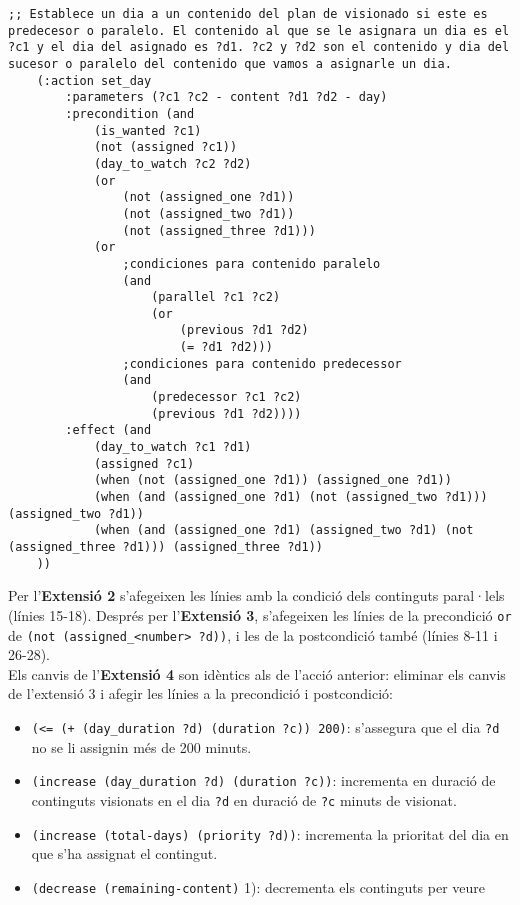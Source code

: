 \documentclass[a4paper]{article}
\begin{document}
	\begin{lstlisting}[language=PDDL, caption={Acció set\_day}, label={lst:set_day}]
	;; Establece un dia a un contenido del plan de visionado si este es predecesor o paralelo. El contenido al que se le asignara un dia es el ?c1 y el dia del asignado es ?d1. ?c2 y ?d2 son el contenido y dia del sucesor o paralelo del contenido que vamos a asignarle un dia.
	(:action set_day
		:parameters (?c1 ?c2 - content ?d1 ?d2 - day)
		:precondition (and 
			(is_wanted ?c1)
			(not (assigned ?c1))
			(day_to_watch ?c2 ?d2)
			(or 
				(not (assigned_one ?d1))
				(not (assigned_two ?d1))
				(not (assigned_three ?d1)))
			(or 
				;condiciones para contenido paralelo
				(and
					(parallel ?c1 ?c2)
					(or 
						(previous ?d1 ?d2)
						(= ?d1 ?d2)))
				;condiciones para contenido predecessor
				(and
					(predecessor ?c1 ?c2)
					(previous ?d1 ?d2))))
		:effect (and 
			(day_to_watch ?c1 ?d1)
			(assigned ?c1)
			(when (not (assigned_one ?d1)) (assigned_one ?d1))
			(when (and (assigned_one ?d1) (not (assigned_two ?d1))) (assigned_two ?d1))
			(when (and (assigned_one ?d1) (assigned_two ?d1) (not (assigned_three ?d1))) (assigned_three ?d1))
	))
	\end{lstlisting}
	
	\noindent Per l'\textbf{Extensió 2} s'afegeixen les línies amb la condició dels continguts paral·lels (línies 15-18). Després per l'\textbf{Extensió 3}, s'afegeixen les línies de la precondició \texttt{or} de \texttt{(not (assigned\_<number> ?d))}, i les de la postcondició també (línies 8-11 i 26-28). \\
	
	\noindent Els canvis de l'\textbf{Extensió 4} son idèntics als de l'acció anterior: eliminar els canvis de l'extensió 3 i afegir les línies a la precondició i postcondició:
	
	\begin{itemize}[label={}, leftmargin=1.5em, itemsep=0pt]
		\item \texttt{(<= (+ (day\_duration ?d) (duration ?c)) 200)}: s'assegura que el dia \texttt{?d} no se li assignin més de 200 minuts. \\
		
		\item \texttt{(increase (day\_duration ?d) (duration ?c))}: incrementa en duració de continguts visionats en el dia \texttt{?d} en duració de \texttt{?c} minuts de visionat.
		
		\item \texttt{(increase (total-days) (priority ?d))}: incrementa la prioritat del dia en que s'ha assignat el contingut.
		
		\item \texttt{(decrease (remaining-content)} 1): decrementa els continguts per veure
	\end{itemize}
	
\end{document}
